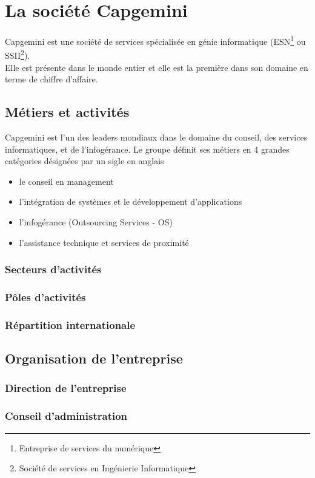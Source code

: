 \chapter{La société Capgemini}
Capgemini est une société de services spécialisée en génie informatique (ESN\footnote{Entreprise de services du numérique} ou SSII\footnote{Société de services en Ingénierie Informatique}).
\\Elle est présente dans le monde entier et elle est la première dans son domaine en terme de chiffre d'affaire.
\section{Métiers et activités}
Capgemini est l'un des leaders mondiaux dans le domaine du conseil, des services informatiques, et de l'infogérance.
Le groupe définit ses métiers en 4 grandes catégories désignées par un sigle en anglais
\\
\begin{itemize}
\item le conseil en management
\item l'intégration de systèmes et le développement d'applications
\item l’infogérance (Outsourcing Services - OS)
\item l'assistance technique et services de proximité
\end{itemize}
\subsection{Secteurs d'activités}
\subsection{Pôles d'activités}
\subsection{Répartition internationale}
\section{Organisation de l'entreprise}
\subsection{Direction de l'entreprise}
\subsection{Conseil d'administration}

